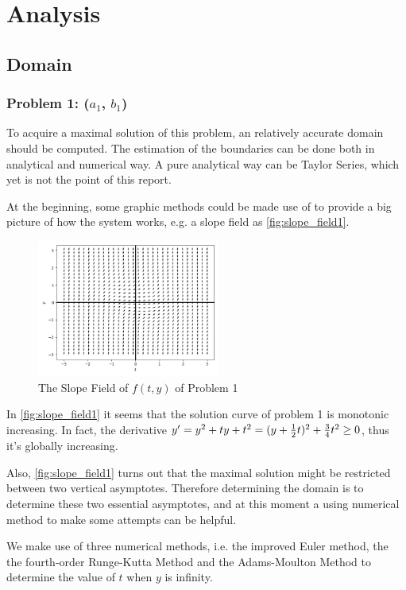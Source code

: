 \documentclass[a4paper]{article}
\begin{document}
    \section{Analysis}
    
    \subsection{Domain}
    
    	\subsubsection{Problem 1: ($a_1$, $b_1$)}
    	
    	To acquire a maximal solution of this problem, an relatively accurate domain should be computed. The estimation of the boundaries can be done both in analytical and numerical way. A pure analytical way can be Taylor Series, which yet is not the point of this report.
	
	At the beginning, some graphic methods could be made use of to provide a big picture of how the system works, e.g. a slope field as \autoref{fig:slope_field1}.
	
	\begin{figure}[H]
		\centering
		\includegraphics[width=6cm]{img/slope_field1.png}
		\caption{\label{fig:slope_field1} The Slope Field of $f(t, y)$ of Problem 1}
	\end{figure}
	
	In \autoref{fig:slope_field1} it seems that the solution curve of problem 1 is monotonic increasing. In fact, the derivative $y' = y^2 + ty + t^2 = (y + {1 \over 2}t)^2 + {3 \over 4}t^2 \geq 0$, thus it's globally increasing.
	
    Also, \autoref{fig:slope_field1} turns out that the maximal solution might be restricted between two vertical asymptotes. Therefore determining the domain is to determine these two essential asymptotes, and at this moment a using numerical method to make some attempts can be helpful.
    
    We make use of three numerical methods, i.e. the improved Euler method, the the fourth-order Runge-Kutta Method and the Adams-Moulton Method to determine the value of $t$ when $y$ is infinity.
    
\end{document}
